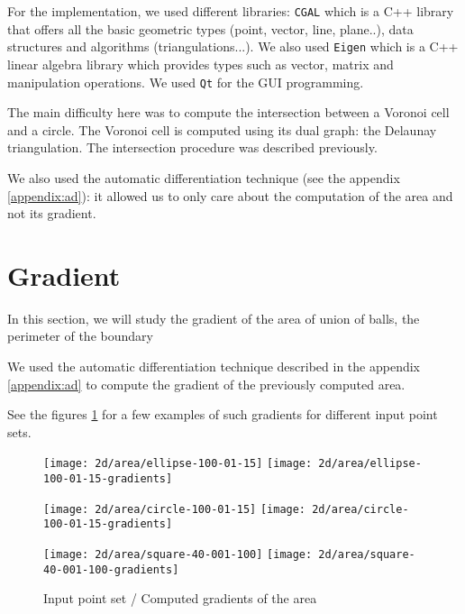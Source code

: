 For the implementation, we used different libraries: \texttt{CGAL} which is a
C++ library that offers all the basic geometric types (point, vector, line,
plane..), data structures and algorithms (triangulations...). We also used
\texttt{Eigen} which is a C++ linear algebra library which provides types such
as vector, matrix and manipulation operations. We used \texttt{Qt} for the GUI
programming.

The main difficulty here was to compute the intersection between a Voronoi cell
and a circle. The Voronoi cell is computed using its dual graph: the Delaunay
triangulation. The intersection procedure was described previously.

We also used the automatic differentiation technique (see the appendix
\ref{appendix:ad}): it allowed us to only care about the computation of the area
and not its gradient.

\section{Gradient}

In this section, we will study the gradient of the area of union of balls, the
perimeter of the boundary

We used the automatic differentiation technique described in the appendix
\ref{appendix:ad} to compute the gradient of the previously computed area.

See the figures \ref{fig:gradients_area_2d} for a few examples of such gradients
for different input point sets.

\begin{figure}[h]
    \centering

    \begin{minipage}{0.8\linewidth}
        \centering
        \texttt{[image: 2d/area/ellipse-100-01-15]}
        \texttt{[image: 2d/area/ellipse-100-01-15-gradients]}
        \label{fig:gradients_area_2d_ellipse}
    \end{minipage}

    \begin{minipage}{0.8\linewidth}
        \centering
        \texttt{[image: 2d/area/circle-100-01-15]}
        \texttt{[image: 2d/area/circle-100-01-15-gradients]}
        \label{fig:gradients_area_2d_circle}
    \end{minipage}

    \begin{minipage}{0.8\linewidth}
        \centering
        \texttt{[image: 2d/area/square-40-001-100]}
        \texttt{[image: 2d/area/square-40-001-100-gradients]}
        \label{fig:gradients_area_2d_square}
    \end{minipage}

    \caption{Input point set / Computed gradients of the area}
    \label{fig:gradients_area_2d}
\end{figure}

